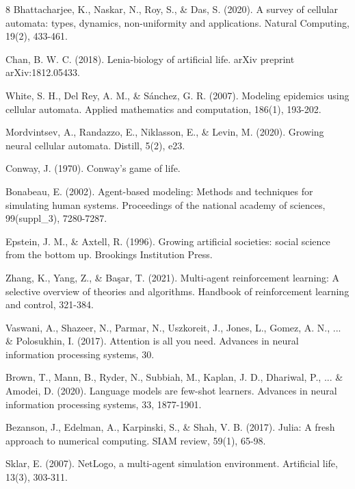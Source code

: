 \documentclass[runningheads]{llncs}
\begin{document}
\begin{thebibliography}{8}
Bhattacharjee, K., Naskar, N., Roy, S., \& Das, S. (2020). A survey of cellular automata: types, dynamics, non-uniformity and applications. Natural Computing, 19(2), 433-461.

Chan, B. W. C. (2018). Lenia-biology of artificial life. arXiv preprint arXiv:1812.05433. 

White, S. H., Del Rey, A. M., \& Sánchez, G. R. (2007). Modeling epidemics using cellular automata. Applied mathematics and computation, 186(1), 193-202. 

Mordvintsev, A., Randazzo, E., Niklasson, E., \& Levin, M. (2020). Growing neural cellular automata. Distill, 5(2), e23. 

Conway, J. (1970). Conway’s game of life. \doi{}

Bonabeau, E. (2002). Agent-based modeling: Methods and techniques for simulating human systems. Proceedings of the national academy of sciences, 99(suppl\_3), 7280-7287. 

Epstein, J. M., \& Axtell, R. (1996). Growing artificial societies: social science from the bottom up. Brookings Institution Press.

Zhang, K., Yang, Z., \& Başar, T. (2021). Multi-agent reinforcement learning: A selective overview of theories and algorithms. Handbook of reinforcement learning and control, 321-384. 

Vaswani, A., Shazeer, N., Parmar, N., Uszkoreit, J., Jones, L., Gomez, A. N., ... \& Polosukhin, I. (2017). Attention is all you need. Advances in neural information processing systems, 30.

Brown, T., Mann, B., Ryder, N., Subbiah, M., Kaplan, J. D., Dhariwal, P., ... \& Amodei, D. (2020). Language models are few-shot learners. Advances in neural information processing systems, 33, 1877-1901.

Bezanson, J., Edelman, A., Karpinski, S., \& Shah, V. B. (2017). Julia: A fresh approach to numerical computing. SIAM review, 59(1), 65-98. 

Sklar, E. (2007). NetLogo, a multi-agent simulation environment. Artificial life, 13(3), 303-311. 


\end{thebibliography}
\end{document}
